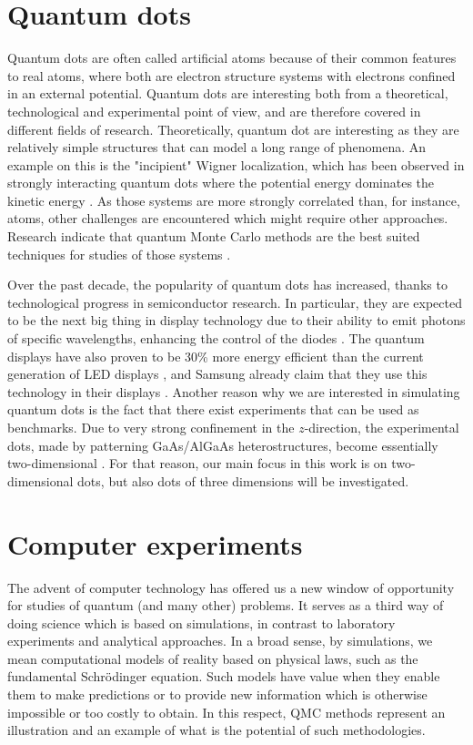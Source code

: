 \section{Quantum dots}
Quantum dots are often called artificial atoms because of their common features to real atoms, where both are electron structure systems with electrons confined in an external potential. Quantum dots are interesting both from a theoretical, technological and experimental point of view, and are therefore covered in different fields of research. Theoretically, quantum dot are interesting as they are relatively simple structures that can model a long range of phenomena. An example on this is the "incipient" Wigner localization, which has been observed in strongly interacting quantum dots where the potential energy dominates the kinetic energy \cite{ghosal_incipient_2007, hogberget_quantum_2013}. As those systems are more strongly correlated than, for instance, atoms, other challenges are encountered which might require other approaches. Research indicate that quantum Monte Carlo methods are the best suited techniques for studies of those systems \cite{ghosal_incipient_2007}.

Over the past decade, the popularity of quantum dots has increased, thanks to technological progress in semiconductor research. In particular, they are expected to be the next big thing in display technology due to their ability to emit photons of specific wavelengths, enhancing the control of the diodes \cite{larsen_AQUADUCT_2019}. The quantum displays have also proven to be 30\% more energy efficient than the current generation of LED displays \cite{manders_8.3:_2015}, and Samsung already claim that they use this technology in their displays \cite{noauthor_2019_nodate}. Another reason why we are interested in simulating quantum dots is the fact that there exist experiments that can be used as benchmarks. Due to very strong confinement in the $z$-direction, the experimental dots, made by patterning GaAs/AlGaAs heterostructures, become essentially two-dimensional \cite{marzin_photoluminescence_1994,brunner_sharp-line_1994}. For that reason, our main focus in this work is on two-dimensional dots, but also dots of three dimensions will be investigated.

\section{Computer experiments}
The advent of computer technology has offered us a new window of opportunity for studies of quantum (and many other) problems. It serves as a third way of doing science which is based on simulations, in contrast to laboratory experiments and analytical approaches. In a broad sense, by simulations, we mean computational models of reality based on physical laws, such as the fundamental Schrödinger equation. Such models have value when they enable them to make predictions or to provide new information which is otherwise impossible or too costly to obtain. In this respect, QMC methods represent an illustration and an example of what is the potential of such methodologies.

